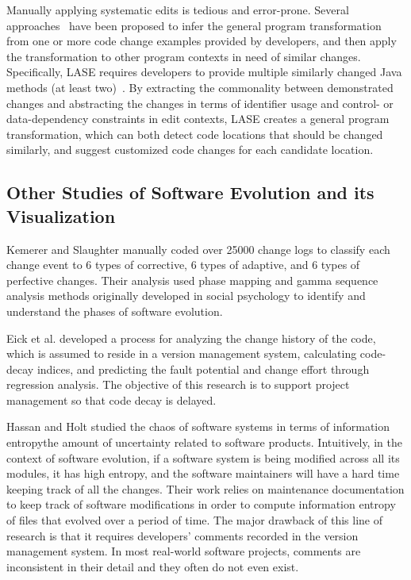 \documentclass[runningheads,a4paper]{llncs}
\begin{document}
Manually applying systematic edits is tedious and error-prone. 
Several approaches~\cite{MKM2011,Meng12:lase,Rolim:2017} have been proposed to infer the general program transformation from one or more code change examples provided by developers, and then apply the transformation to other program contexts in need of similar changes. Specifically, LASE requires developers to provide multiple similarly changed Java methods (at least two)~\cite{Meng12:lase}. By extracting the commonality between demonstrated changes and abstracting the changes in terms of identifier usage and control- or data-dependency constraints in edit contexts, LASE creates a general program transformation, which can both detect code locations that should be changed similarly, and suggest customized code changes for each candidate location.


\subsection{Other Studies of Software Evolution and its Visualization} 
Kemerer and Slaughter \cite{Kemerer1999} manually coded over 25000 change logs to classify each change event to 6 types of corrective, 6 types of adaptive, and 6 types of perfective changes. Their analysis used phase mapping and gamma sequence analysis methods originally developed in social psychology to identify and understand the phases of software evolution. 

Eick et al. \cite{Eick2001:CodeDecay} developed a process for analyzing the change history of the code, which is assumed to reside in a version management system, calculating code-decay indices, and predicting the fault potential and change effort through regression analysis. The objective of this research is to support project management so that code decay is delayed. 

Hassan and Holt \cite{Hassan2003} studied the chaos of software systems in terms of information entropy\textemdash the amount of uncertainty related to software products. Intuitively, in the context of software evolution, if a software system is being modified across all its modules, it has high entropy, and the software maintainers will have a hard time keeping track of all the changes. Their work relies on maintenance documentation to keep track of software modifications in order to compute information entropy of files that evolved over a period of time. The major drawback of this line of research is that it requires developers' comments recorded in the version management system. In most real-world software projects, comments are inconsistent in their detail and they often do not even exist. 
\end{document}
